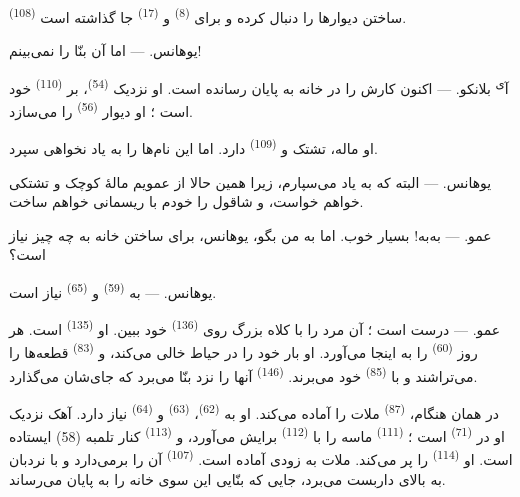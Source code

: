  \textsuperscript{(108)} ساختن دیوارها را دنبال کرده و برای
 \textsuperscript{(8)} و 
\textsuperscript{(17)} جا گذاشته است.

\textsc{یوهانس}. --- اما آن بنّا را نمی‌بینم!

آ\textsuperscript{ی} \textsc{بلانکو}. --- اکنون کارش را در خانه به پایان
رسانده است. او نزدیک  \textsuperscript{(54)}، بر
 \textsuperscript{(110)} خود است ؛ او دیوار
 \textsuperscript{(56)} را می‌سازد.

او ماله، تشتک و  \textsuperscript{(109)} دارد. اما این
نام‌ها را به یاد نخواهی سپرد.

\textsc{یوهانس}. --- البته که به یاد می‌سپارم، زیرا همین حالا از عمویم
مالهٔ کوچک و تشتکی خواهم خواست، و شاقول را خودم با ریسمانی خواهم ساخت.

\VUsaut{3.0mm}
\VUsaut{3.0mm}

\textsc{عمو}. --- به‌به! بسیار خوب. اما به من بگو، یوهانس، برای ساختن
خانه به چه چیز نیاز است؟

\textsc{یوهانس}. --- به  \textsuperscript{(59)} و
 \textsuperscript{(65)} نیاز است.

\textsc{عمو}. --- درست است ؛ آن مرد را با کلاه بزرگ روی 
\textsuperscript{(136)} خود ببین. او 
\textsuperscript{(135)} است. هر روز 
\textsuperscript{(60)} را به اینجا می‌آورد. او بار خود را در حیاط خالی
می‌کند، و  \textsuperscript{(83)} قطعه‌ها را
می‌تراشند و با  \textsuperscript{(85)} خود می‌برند.
 \textsuperscript{(146)} آنها را نزد بنّا می‌برد که
جای‌شان می‌گذارد.

در همان هنگام،  \textsuperscript{(87)} ملات را آماده
می‌کند. او به  \textsuperscript{(62)}، 
\textsuperscript{(63)} و  \textsuperscript{(64)} نیاز دارد.
آهک نزدیک او در  \textsuperscript{(71)} است ؛
 \textsuperscript{(111)} ماسه را با 
\textsuperscript{(112)} برایش می‌آورد، و 
\textsuperscript{(113)} کنار تلمبه (58) ایستاده است. او 
\textsuperscript{(114)} را پر می‌کند. ملات به زودی آماده است.
 \textsuperscript{(107)} آن را برمی‌دارد و با نردبان به
بالای داربست می‌برد، جایی که بنّایی این سوی خانه را به پایان می‌رساند.

